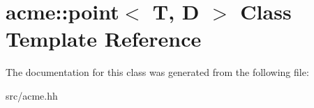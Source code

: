 \hypertarget{classacme_1_1point}{}\section{acme\+:\+:point$<$ T, D $>$ Class Template Reference}
\label{classacme_1_1point}


The documentation for this class was generated from the following file\+:\begin{DoxyCompactItemize}
\item 
src/acme.\+hh\end{DoxyCompactItemize}

